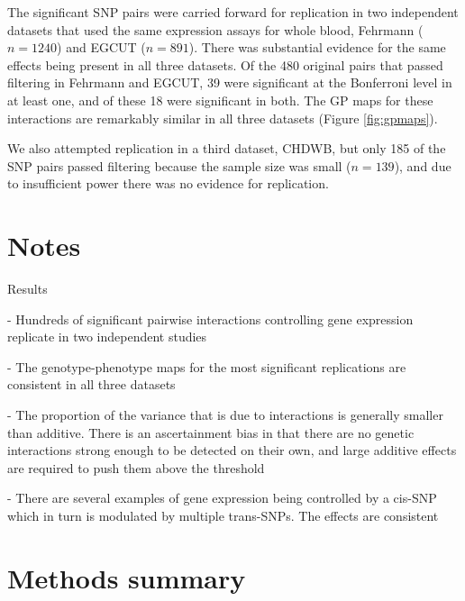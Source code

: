 \documentclass{article}
\begin{document}
The significant SNP pairs were carried forward for replication in two independent datasets that used the same expression assays for whole blood, Fehrmann ($n=1240$) and EGCUT ($n=891$). There was substantial evidence for the same effects being present in all three datasets. Of the 480 original pairs that passed filtering in Fehrmann and EGCUT, 39 were significant at the Bonferroni level in at least one, and of these 18 were significant in both. The GP maps for these interactions are remarkably similar in all three datasets (Figure \ref{fig:gpmaps}). 

We also attempted replication in a third dataset, CHDWB, but only 185 of the SNP pairs passed filtering because the sample size was small ($n=139$), and due to insufficient power there was no evidence for replication.


\section{Notes}

Results


- Hundreds of significant pairwise interactions controlling gene expression replicate in two independent studies



- The genotype-phenotype maps for the most significant replications are consistent in all three datasets



- The proportion of the variance that is due to interactions is generally smaller than additive. There is an ascertainment bias in that there are no genetic interactions strong enough to be detected on their own, and large additive effects are required to push them above the threshold



- There are several examples of gene expression being controlled by a cis-SNP which in turn is modulated by multiple trans-SNPs. The effects are consistent 






\section{Methods summary}
\end{document}
